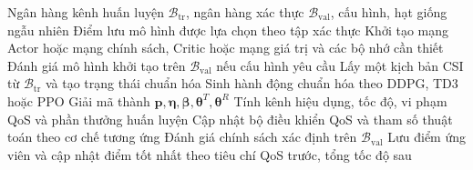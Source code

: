 \begin{algorithm}[htbp]
\caption{Quy trình huấn luyện chung của nhóm DRL}
\label{alg:huan-luyen}
\begin{algorithmic}[1]
\Require Ngân hàng kênh huấn luyện $\mathcal{B}_{\mathrm{tr}}$, ngân hàng xác thực
         $\mathcal{B}_{\mathrm{val}}$, cấu hình, hạt giống ngẫu nhiên
\Ensure  Điểm lưu mô hình được lựa chọn theo tập xác thực
\State Khởi tạo mạng Actor hoặc mạng chính sách, Critic hoặc mạng giá trị và các bộ nhớ cần thiết
\State Đánh giá mô hình khởi tạo trên $\mathcal{B}_{\mathrm{val}}$ nếu cấu hình yêu cầu
  \State Lấy một kịch bản CSI từ $\mathcal{B}_{\mathrm{tr}}$ và tạo trạng thái chuẩn hóa
  \State Sinh hành động chuẩn hóa theo DDPG, TD3 hoặc PPO
  \State Giải mã thành $\mathbf{p}, \boldsymbol{\eta}, \boldsymbol{\beta},
         \boldsymbol{\theta}^T, \boldsymbol{\theta}^R$
  \State Tính kênh hiệu dụng, tốc độ, vi phạm QoS và phần thưởng huấn luyện
  \State Cập nhật bộ điều khiển QoS và tham số thuật toán theo cơ chế tương ứng
    \State Đánh giá chính sách xác định trên $\mathcal{B}_{\mathrm{val}}$
    \State Lưu điểm ứng viên và cập nhật điểm tốt nhất theo tiêu chí QoS trước, tổng tốc độ sau
  \EndIf
\EndFor
\end{algorithmic}
\end{algorithm}
